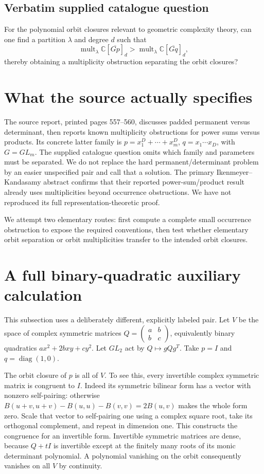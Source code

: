 \documentclass[11pt]{article}
\begin{document}
\subsection{Verbatim supplied catalogue question}
For the polynomial orbit closures relevant to geometric complexity theory, can one find a partition $\lambda$ and degree $d$ such that
$$
\operatorname{mult}_\lambda\mathbb C[\overline{Gp}]_d>\operatorname{mult}_\lambda\mathbb C[\overline{Gq}]_d,
$$
thereby obtaining a multiplicity obstruction separating the orbit closures?

\section{What the source actually specifies}
The source report, printed pages 557--560, discusses padded permanent
versus determinant, then reports known multiplicity obstructions for
power sums versus products. Its concrete latter family is
$p=x_1^D+\cdots+x_m^D$, $q=x_1\cdots x_D$, with $G=GL_m$.
The supplied catalogue question omits which family and parameters
must be separated. We do not replace the hard permanent/determinant
problem by an easier unspecified pair and call that a solution.
The primary Ikenmeyer--Kandasamy abstract confirms that their reported
power-sum/product result already uses multiplicities beyond occurrence
obstructions. We have not reproduced its full representation-theoretic proof.

We attempt two elementary routes: first compute a complete small
occurrence obstruction to expose the required conventions, then test
whether elementary orbit separation or orbit multiplicities transfer
to the intended orbit closures.

\section{A full binary-quadratic auxiliary calculation}
This subsection uses a deliberately different, explicitly labeled
pair. Let $V$ be the space of complex symmetric matrices
$Q=\left(\begin{smallmatrix}a&b\\b&c\end{smallmatrix}\right)$,
equivalently binary quadratics $ax^2+2bxy+cy^2$. Let $GL_2$ act
by $Q\mapsto gQg^T$. Take $p=I$ and
$q=\operatorname{diag}(1,0)$.

The orbit closure of $p$ is all of $V$. To see this, every invertible
complex symmetric matrix is congruent to $I$. Indeed its symmetric
bilinear form has a vector with nonzero self-pairing: otherwise
$B(u+v,u+v)-B(u,u)-B(v,v)=2B(u,v)$ makes the whole form zero.
Scale that vector to self-pairing one using a complex square root,
take its orthogonal complement, and repeat in dimension one. This
constructs the congruence for an invertible form. Invertible symmetric
matrices are dense, because $Q+tI$ is invertible except at the
finitely many roots of its monic determinant polynomial. A polynomial
vanishing on the orbit consequently vanishes on all $V$ by continuity.
\end{document}
